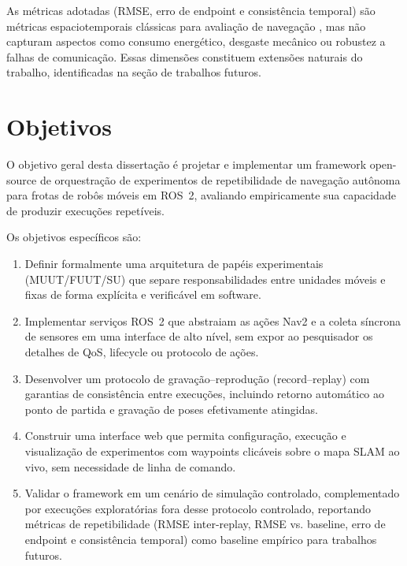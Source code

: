As métricas adotadas (RMSE, erro de endpoint e consistência temporal) são
métricas espaciotemporais clássicas para avaliação de navegação \cite{amigoni2010,sturm2012,zhang2018trajectory},
mas não capturam aspectos como consumo energético, desgaste mecânico ou robustez
a falhas de comunicação. Essas dimensões constituem extensões naturais do trabalho,
identificadas na seção de trabalhos futuros.

\section{Objetivos}
\label{sec:objetivos}

O objetivo geral desta dissertação é projetar e implementar um framework
open-source de orquestração de experimentos de repetibilidade de navegação
autônoma para frotas de robôs móveis em ROS~2, avaliando empiricamente sua
capacidade de produzir execuções repetíveis.

Os objetivos específicos são:

\begin{enumerate}
    \item Definir formalmente uma arquitetura de papéis experimentais (MUUT/FUUT/SU)
    que separe responsabilidades entre unidades móveis e fixas de forma explícita e
    verificável em software.

    \item Implementar serviços ROS~2 que abstraiam as ações Nav2 e a coleta síncrona
    de sensores em uma interface de alto nível, sem expor ao pesquisador os detalhes
    de QoS, lifecycle ou protocolo de ações.

    \item Desenvolver um protocolo de gravação--reprodução (record--replay) com
    garantias de consistência entre execuções, incluindo retorno automático ao ponto
    de partida e gravação de poses efetivamente atingidas.

    \item Construir uma interface web que permita configuração, execução e visualização
    de experimentos com waypoints clicáveis sobre o mapa SLAM ao vivo, sem necessidade
    de linha de comando.

    \item Validar o framework em um cenário de simulação controlado,
    complementado por execuções exploratórias fora desse protocolo
    controlado, reportando métricas de repetibilidade (RMSE inter-replay,
    RMSE vs. baseline, erro de endpoint e consistência temporal) como
    baseline empírico para trabalhos futuros.
\end{enumerate}



